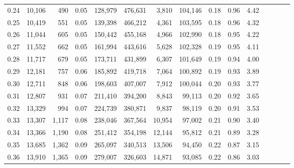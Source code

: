 \begin{tabular}{rrrcrrrrrrrrrrr}
0.24 &  10,106 &    490 &                                       0.05 &  128,979 &  476,631 &    3,810 &  104,146 &  0.18 &  0.96 &                         4.42 \\
0.25 &  10,419 &    551 &                                       0.05 &  139,398 &  466,212 &    4,361 &  103,595 &  0.18 &  0.96 &                         4.32 \\
0.26 &  11,044 &    605 &                                       0.05 &  150,442 &  455,168 &    4,966 &  102,990 &  0.18 &  0.95 &                         4.22 \\
0.27 &  11,552 &    662 &                                       0.05 &  161,994 &  443,616 &    5,628 &  102,328 &  0.19 &  0.95 &                         4.11 \\
0.28 &  11,717 &    679 &                                       0.05 &  173,711 &  431,899 &    6,307 &  101,649 &  0.19 &  0.94 &                         4.00 \\
0.29 &  12,181 &    757 &                                       0.06 &  185,892 &  419,718 &    7,064 &  100,892 &  0.19 &  0.93 &                         3.89 \\
0.30 &  12,711 &    848 &                                       0.06 &  198,603 &  407,007 &    7,912 &  100,044 &  0.20 &  0.93 &                         3.77 \\
0.31 &  12,807 &    931 &                                       0.07 &  211,410 &  394,200 &    8,843 &   99,113 &  0.20 &  0.92 &                         3.65 \\
0.32 &  13,329 &    994 &                                       0.07 &  224,739 &  380,871 &    9,837 &   98,119 &  0.20 &  0.91 &                         3.53 \\
0.33 &  13,307 &  1,117 &                                       0.08 &  238,046 &  367,564 &   10,954 &   97,002 &  0.21 &  0.90 &                         3.40 \\
0.34 &  13,366 &  1,190 &                                       0.08 &  251,412 &  354,198 &   12,144 &   95,812 &  0.21 &  0.89 &                         3.28 \\
0.35 &  13,685 &  1,362 &                                       0.09 &  265,097 &  340,513 &   13,506 &   94,450 &  0.22 &  0.87 &                         3.15 \\
0.36 &  13,910 &  1,365 &                                       0.09 &  279,007 &  326,603 &   14,871 &   93,085 &  0.22 &  0.86 &                         3.03 \\

\end{tabular}
